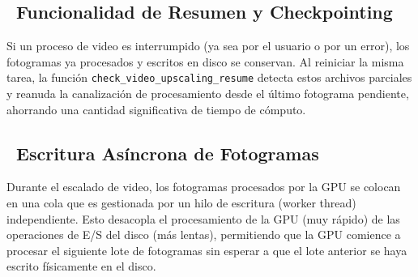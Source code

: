 \documentclass[11pt, a4paper]{article}
\newcommand{\SectionColor}{WarlockGray} %
\newcommand{\setsectioncolor}[1]{\renewcommand{\SectionColor}{#1}}
\newcommand{\inlinecode}[1]{\colorbox{WarlockLightGray}{\small\texttt{#1}}}
\begin{document}
\subsection{\faSyncAlt\ Funcionalidad de Resumen y Checkpointing}
Si un proceso de video es interrumpido (ya sea por el usuario o por un error), los fotogramas ya procesados y escritos en disco se conservan. Al reiniciar la misma tarea, la función \inlinecode{check\_video\_upscaling\_resume} detecta estos archivos parciales y reanuda la canalización de procesamiento desde el último fotograma pendiente, ahorrando una cantidad significativa de tiempo de cómputo.

\subsection{\faBolt\ Escritura Asíncrona de Fotogramas}
Durante el escalado de video, los fotogramas procesados por la GPU se colocan en una cola que es gestionada por un hilo de escritura (worker thread) independiente. Esto desacopla el procesamiento de la GPU (muy rápido) de las operaciones de E/S del disco (más lentas), permitiendo que la GPU comience a procesar el siguiente lote de fotogramas sin esperar a que el lote anterior se haya escrito físicamente en el disco.

\setsectioncolor{GlossaryColor}
\end{document}
